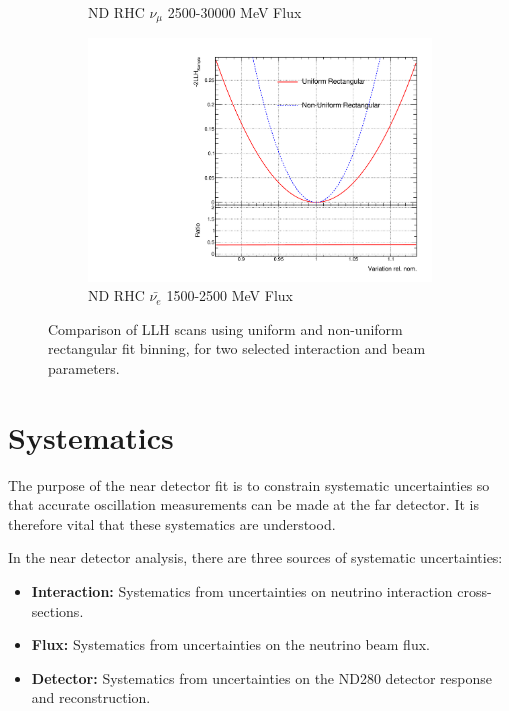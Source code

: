 \begin{figure}
\begin{subfigure}{.49\textwidth}
  \caption{ND RHC $\nu_{\mu}$ 2500-30000 MeV Flux}
  \label{fig:b_30_sampolyLLH}
\end{subfigure}
\begin{subfigure}{.49\textwidth}
  \centering
  \includegraphics[width=0.95\linewidth]{figs/b_40_sampolyLLH}
  \caption{ND RHC $\bar{\nu_{e}}$ 1500-2500 MeV Flux}
  \label{fig:b_40_sampolyLLH}
\end{subfigure}
\caption{Comparison of LLH scans using uniform and non-uniform rectangular fit binning, for two selected interaction and beam parameters.}
\label{fig:polyllhscans}
\end{figure}


\section{Systematics}\label{sec:syst}

The purpose of the near detector fit is to constrain systematic uncertainties so that accurate oscillation measurements can be made at the far detector. It is therefore vital that these systematics are understood. 

In the near detector analysis, there are three sources of systematic uncertainties: 

\begin{itemize}

\item \textbf{Interaction: } Systematics from uncertainties on neutrino interaction cross-sections.

\item \textbf{Flux: } Systematics from uncertainties on the neutrino beam flux.

\item \textbf{Detector: } Systematics from uncertainties on the ND280 detector response and reconstruction.

\end{itemize}

